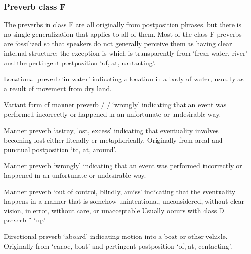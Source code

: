 \subsubsection{Preverb class F}\label{sec:inventory-preverb-F}

The preverbs in class F are all originally from postposition phrases, but there is no single
	generalization that applies to all of them.
Most of the class F preverbs are fossilized so that speakers do not generally perceive them as having
	clear internal structure; the exception is  which is transparently from
	 ‘fresh water, river’ and the pertingent postposition
	 ‘of, at, contacting’.

\begin{morphdesc}
\item[\X{héenx̱=}]
	Locational preverb ‘in water’ indicating a location in a body of water,
		usually as a result of movement from dry land.

\item[\X{ḵáaḵw=}]
\item[\X{ḵáaḵwt=}] \removeitemvspace
\item[\X{ḵáaḵwx̱=}] \removeitemvspace
	Variant form of manner preverb   /  /  ‘wrongly’
		indicating that an event was performed incorrectly
		or happened in an unfortunate or undesirable way.

\item[\X{ḵut=}]
	Manner preverb ‘astray, lost, excess’ indicating that eventuality involves becoming lost
		either literally or metaphorically.
	Originally from areal 
		and punctual postposition  ‘to, at, around’.

\item[\X{ḵwáaḵ=}]
\item[\X{ḵwáaḵt=}] \removeitemvspace
\item[\X{ḵwáaḵx̱=}] \removeitemvspace
	Manner preverb ‘wrongly’ indicating that an event was performed incorrectly
		or happened in an unfortunate or undesirable way.

\item[\X{ux̱=}]
\item[\X{úx̱=}] \removeitemvspace
	Manner preverb ‘out of control, blindly, amiss’
		indicating that the eventuality happens in a manner that is somehow unintentional,
		unconsidered, without clear vision, in error, without care, or unacceptable
	Usually occurs with class D preverb  \~\  ‘up’.

\item[\X{yaax̱=}]
	Directional preverb ‘aboard’ indicating motion into a boat or other vehicle.
	Originally from  ‘canoe, boat’
		and pertingent postposition  ‘of, at, contacting’.


\end{morphdesc}
